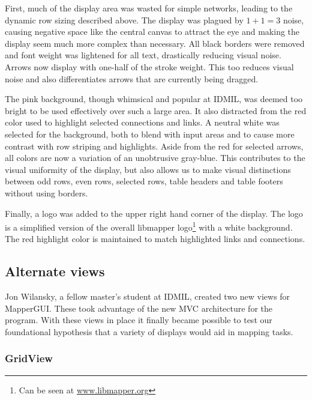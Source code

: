 First, much of the display area was wasted for simple networks, leading to the dynamic row sizing described above. The display was plagued by $1 + 1 = 3$ noise, causing negative space like the central canvas to attract the eye and making the display seem much more complex than necessary. All black borders were removed and font weight was lightened for all text, drastically reducing visual noise. Arrows now display with one-half of the stroke weight. This too reduces visual noise and also differentiates arrows that are currently being dragged.

The pink background, though whimsical and popular at IDMIL, was deemed too bright to be used effectively over such a large area. It also distracted from the red color used to highlight selected connections and links. A neutral white was selected for the background, both to blend with input areas and to cause more contrast with row striping and highlights. Aside from the red for selected arrows, all colors are now a variation of an unobtrusive gray-blue. This contributes to the visual uniformity of the display, but also allows us to make visual distinctions between odd rows, even rows, selected rows, table headers and table footers without using borders.

Finally, a logo was added to the upper right hand corner of the display. The logo is a simplified version of the overall libmapper logo\footnote{Can be seen at \url{www.libmapper.org}} with a white background. The red highlight color is maintained to match highlighted links and connections.


	\subsection{Alternate views} %
	\label{sec:alternate_views}

Jon Wilansky, a fellow master's student at IDMIL, created two new views for MapperGUI. These took advantage of the new MVC architecture for the program. With these views in place it finally became possible to test our foundational hypothesis that a variety of displays would aid in mapping tasks.

		\subsubsection{GridView}

